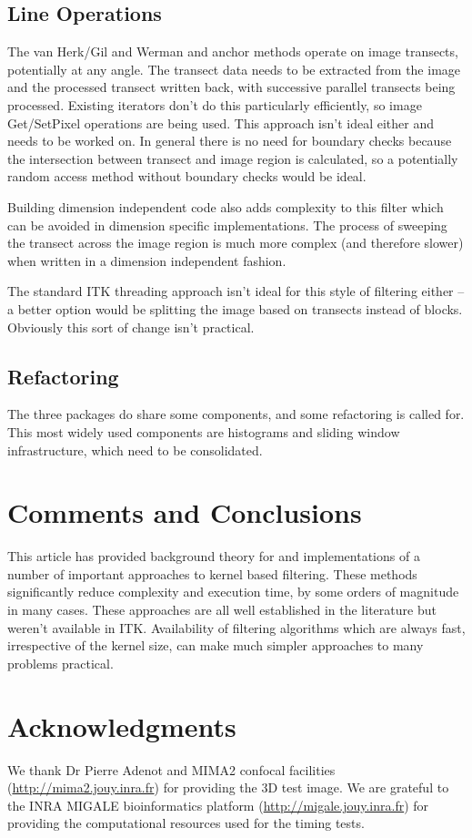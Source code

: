 \documentclass{InsightArticle}
\begin{document}
\subsection{Line Operations}
The van Herk/Gil and Werman and anchor methods operate on image transects, potentially
at any angle. The transect data needs to be extracted from the image and the processed
transect written back, with successive parallel transects being processed. 
Existing iterators don't do this particularly efficiently, so image Get/SetPixel operations 
are being used. This approach isn't ideal either and needs to be worked on. In general
there is no need for boundary checks because the intersection between transect and image region
is calculated, so a potentially random access method without boundary checks would be ideal.

Building dimension independent code also adds complexity to this filter which can be avoided in
dimension specific implementations. The process of sweeping the transect across the image region
is much more complex (and therefore slower) when written in a dimension independent fashion.

The standard ITK threading approach isn't ideal for this style of filtering either -- a better 
option would be splitting the image based on transects instead of blocks. Obviously this
sort of change isn't practical.

\subsection{Refactoring}
The three packages do share some components, and some refactoring is
called for. This most widely used components are histograms and
sliding window infrastructure, which need to be consolidated.

\section{Comments and Conclusions}
This article has provided background theory for and implementations of
a number of important approaches to kernel based filtering. These
methods significantly reduce complexity and execution time, by some
orders of magnitude in many cases. These approaches are all well
established in the literature but weren't available in
ITK. Availability of filtering algorithms which are always fast,
irrespective of the kernel size, can make much simpler approaches to
many problems practical.

\section{Acknowledgments}
We thank Dr Pierre Adenot and MIMA2 confocal facilities
(\url{http://mima2.jouy.inra.fr}) for providing the 3D test image.
We are grateful to the INRA MIGALE bioinformatics platform
(\url{http://migale.jouy.inra.fr}) for providing the computational resources
used for the timing tests.
\end{document}
